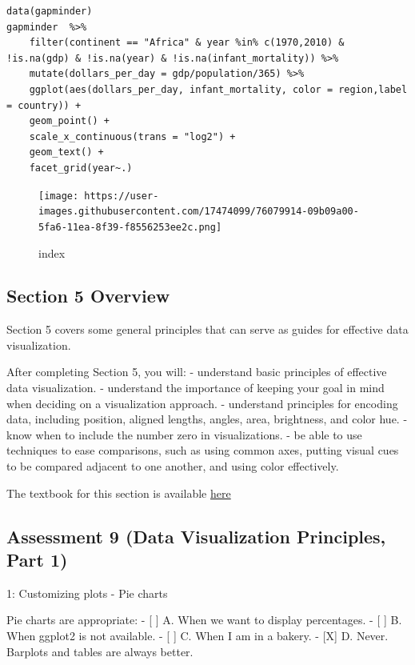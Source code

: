 \documentclass[
]{article}
\begin{document}
\begin{verbatim}
data(gapminder)
gapminder  %>%
    filter(continent == "Africa" & year %in% c(1970,2010) & !is.na(gdp) & !is.na(year) & !is.na(infant_mortality)) %>%
    mutate(dollars_per_day = gdp/population/365) %>%
    ggplot(aes(dollars_per_day, infant_mortality, color = region,label = country)) +
    geom_point() +
    scale_x_continuous(trans = "log2") +
    geom_text() +
    facet_grid(year~.)
\end{verbatim}

\begin{figure}
\centering
\texttt{[image: https://user-images.githubusercontent.com/17474099/76079914-09b09a00-5fa6-11ea-8f39-f8556253ee2c.png]}
\caption{index}
\end{figure}

\hypertarget{section-5-overview}{%
\subsection{Section 5 Overview}\label{section-5-overview}}

Section 5 covers some general principles that can serve as guides for
effective data visualization.

After completing Section 5, you will: - understand basic principles of
effective data visualization. - understand the importance of keeping
your goal in mind when deciding on a visualization approach. -
understand principles for encoding data, including position, aligned
lengths, angles, area, brightness, and color hue. - know when to include
the number zero in visualizations. - be able to use techniques to ease
comparisons, such as using common axes, putting visual cues to be
compared adjacent to one another, and using color effectively.

The textbook for this section is available
\href{https://rafalab.github.io/dsbook/data-visualization-principles.html}{here}

\hypertarget{assessment-9-data-visualization-principles-part-1}{%
\subsection{Assessment 9 (Data Visualization Principles, Part
1)}\label{assessment-9-data-visualization-principles-part-1}}

1: Customizing plots - Pie charts

Pie charts are appropriate: - {[} {]} A. When we want to display
percentages. - {[} {]} B. When ggplot2 is not available. - {[} {]} C.
When I am in a bakery. - {[}X{]} D. Never. Barplots and tables are
always better.
\end{document}
